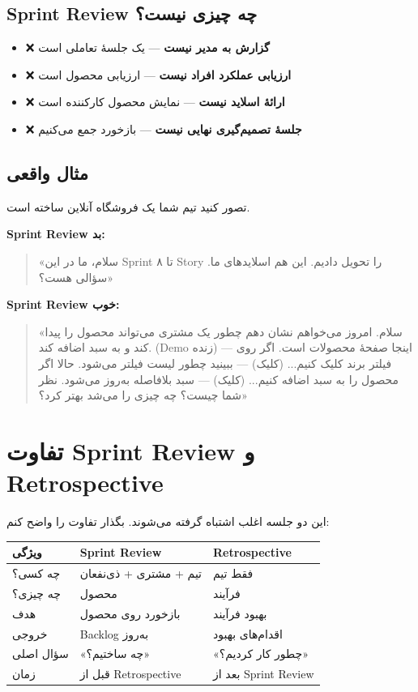 \documentclass[12pt, a4paper]{article}
\begin{document}
\subsection{Sprint Review چه چیزی \textbf{نیست}؟}

\begin{itemize}
    \item ❌ \textbf{گزارش به مدیر نیست} — یک جلسهٔ تعاملی است
    \item ❌ \textbf{ارزیابی عملکرد افراد نیست} — ارزیابی محصول است
    \item ❌ \textbf{ارائهٔ اسلاید نیست} — نمایش محصول کارکننده است
    \item ❌ \textbf{جلسهٔ تصمیم‌گیری نهایی نیست} — بازخورد جمع می‌کنیم
\end{itemize}

\subsection{مثال واقعی}

تصور کنید تیم شما یک فروشگاه آنلاین ساخته است.

\textbf{Sprint Review بد:}
\begin{quote}
«سلام، ما در این Sprint ۸ تا Story را تحویل دادیم. این هم اسلایدهای ما. 
سؤالی هست؟»
\end{quote}

\textbf{Sprint Review خوب:}
\begin{quote}
«سلام. امروز می‌خواهم نشان دهم چطور یک مشتری می‌تواند محصول را پیدا کند و به 
سبد اضافه کند. (Demo زنده) — اینجا صفحهٔ محصولات است. اگر روی فیلتر برند 
کلیک کنیم... (کلیک) — ببینید چطور لیست فیلتر می‌شود. حالا اگر محصول را به 
سبد اضافه کنیم... (کلیک) — سبد بلافاصله به‌روز می‌شود. نظر شما چیست؟ چه چیزی 
را می‌شد بهتر کرد؟»
\end{quote}

\section{تفاوت Sprint Review و Retrospective}

این دو جلسه اغلب اشتباه گرفته می‌شوند. بگذار تفاوت را واضح کنم:

\begin{center}
\begin{tabular}{|l|l|l|}
\hline
\textbf{ویژگی} & \textbf{Sprint Review} & \textbf{Retrospective} \\
\hline
چه کسی؟ & تیم + مشتری + ذی‌نفعان & فقط تیم \\
\hline
چه چیزی؟ & محصول & فرآیند \\
\hline
هدف & بازخورد روی محصول & بهبود فرآیند \\
\hline
خروجی & Backlog به‌روز & اقدام‌های بهبود \\
\hline
سؤال اصلی & «چه ساختیم؟» & «چطور کار کردیم؟» \\
\hline
زمان & قبل از Retrospective & بعد از Sprint Review \\
\hline
\end{tabular}
\end{center}
\end{document}
